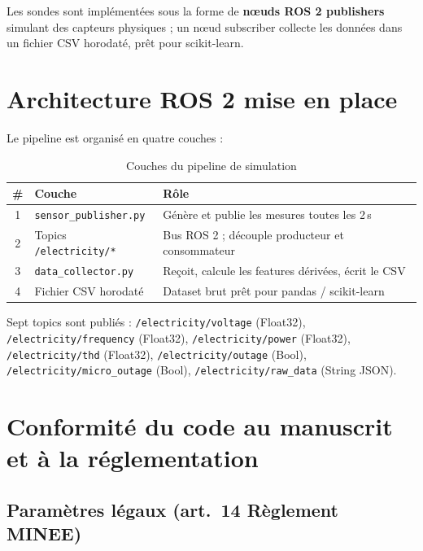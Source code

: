 \documentclass[12pt,a4paper]{article}
\begin{document}
Les sondes sont implémentées sous la forme de \textbf{nœuds ROS 2 publishers}
simulant des capteurs physiques ; un nœud subscriber collecte les données dans un
fichier CSV horodaté, prêt pour scikit-learn.

\section{Architecture ROS 2 mise en place}

Le pipeline est organisé en quatre couches :

\begin{table}[h]
\centering
\begin{tabular}{@{}clp{8cm}@{}}
\toprule
\# & Couche & Rôle \\
\midrule
1 & \texttt{sensor\_publisher.py} & Génère et publie les mesures toutes les 2\,s \\
2 & Topics \texttt{/electricity/*} & Bus ROS 2 ; découple producteur et consommateur \\
3 & \texttt{data\_collector.py}   & Reçoit, calcule les features dérivées, écrit le CSV \\
4 & Fichier CSV horodaté          & Dataset brut prêt pour pandas / scikit-learn \\
\bottomrule
\end{tabular}
\caption{Couches du pipeline de simulation}
\end{table}

Sept topics sont publiés :
\texttt{/electricity/voltage} (Float32),
\texttt{/electricity/frequency} (Float32),
\texttt{/electricity/power} (Float32),
\texttt{/electricity/thd} (Float32),
\texttt{/electricity/outage} (Bool),
\texttt{/electricity/micro\_outage} (Bool),
\texttt{/electricity/raw\_data} (String JSON).

\section{Conformité du code au manuscrit et à la réglementation}

\subsection{Paramètres légaux (art.~14 Règlement MINEE)}
\end{document}
